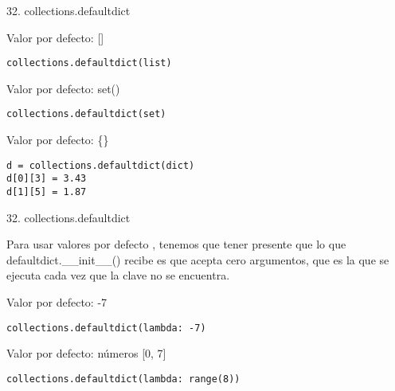 \begin{frame}[fragile]{32. collections.defaultdict}
  \small
  \begin{exampleblock}
    {Valor por defecto: []}
    \begin{lstlisting}
collections.defaultdict(list)
    \end{lstlisting}
  \end{exampleblock}

  \small
  \begin{exampleblock}
    {Valor por defecto: set()}
    \begin{lstlisting}
collections.defaultdict(set)
    \end{lstlisting}
  \end{exampleblock}

  \begin{exampleblock}
    {Valor por defecto: \{\}}
    \begin{lstlisting}
d = collections.defaultdict(dict)
d[0][3] = 3.43
d[1][5] = 1.87
    \end{lstlisting}
  \end{exampleblock}
\end{frame}

\begin{frame}[fragile]{32. collections.defaultdict}
  \small
  \begin{block}{}
    \centering
    Para usar valores por defecto , tenemos que tener presente que lo que
    defaultdict.\_\_init\_\_() recibe es  que
    acepta cero argumentos, que es la que se ejecuta cada vez que la
    clave no se encuentra.
  \end{block}

  \begin{exampleblock}
    {Valor por defecto: -7}
    \begin{lstlisting}
collections.defaultdict(lambda: -7)
    \end{lstlisting}
  \end{exampleblock}

  \begin{exampleblock}
    {Valor por defecto: números [0, 7]}
    \begin{lstlisting}
collections.defaultdict(lambda: range(8))
    \end{lstlisting}
  \end{exampleblock}
\end{frame}
